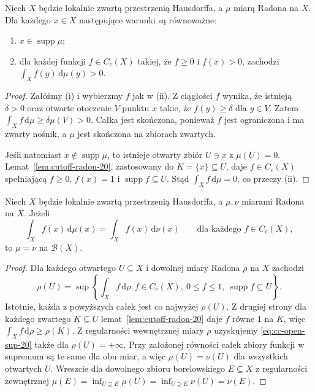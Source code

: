 \begin{wniosek}
\label{cor:support-test-20}
Niech $X$ będzie lokalnie zwartą przestrzenią Hausdorffa,
a $\mu$ miarą Radona na $X$. Dla każdego $x\in X$
następujące warunki są równoważne:
\begin{enumerate}[label=\textup{(\roman*)}]
\item $x\in\operatorname{supp}\mu$;
\item dla każdej funkcji $f\in C_c(X)$ takiej, że
$f\ge0$ i $f(x)>0$, zachodzi
$\int_X f(y)\,\mathrm d\mu(y)>0$.
\end{enumerate}
\end{wniosek}
\begin{proof}
Załóżmy (i) i wybierzmy $f$ jak w (ii).
Z ciągłości $f$ wynika, że istnieją $\delta>0$
oraz otwarte otoczenie $V$ punktu $x$ takie,
że $f(y)\ge\delta$ dla $y\in V$. Zatem
$\int_Xf\,\mathrm d\mu\ge\delta\mu(V)>0$.
Całka jest skończona, ponieważ $f$ jest
ograniczona i ma zwarty nośnik, a $\mu$
jest skończona na zbiorach zwartych.

Jeśli natomiast $x\notin\operatorname{supp}\mu$,
to istnieje otwarty zbiór $U\ni x$ z $\mu(U)=0$.
Lemat~\ref{lem:cutoff-radon-20}, zastosowany do
$K=\{x\}\subseteq U$, daje $f\in C_c(X)$
spełniającą $f\ge0$, $f(x)=1$ i
$\operatorname{supp}f\subseteq U$.
Stąd $\int_X f\,\mathrm d\mu=0$, co przeczy (ii).
\end{proof}

\begin{twierdzenie}
\label{thm:uniqueness-cc-20}\label{tw:radon-unikalnosc}
Niech $X$ będzie lokalnie zwartą przestrzenią Hausdorffa,
a $\mu,\nu$ miarami Radona na $X$. Jeżeli
\[
\int_X f(x)\,\mathrm d\mu(x)
=\int_Xf(x)\,\mathrm d\nu(x)
\qquad\text{dla każdego }f\in C_c(X),
\]
to $\mu=\nu$ na $\mathcal B(X)$.
\end{twierdzenie}
\begin{proof}
Dla każdego otwartego $U\subseteq X$ i dowolnej
miary Radona $\rho$ na $X$ zachodzi
\begin{equation}\label{eq:cc-open-sup-20}
\rho(U)=\sup\left\{\int_Xf\,\mathrm d\rho:
 f\in C_c(X),\ 0\le f\le1,\
 \operatorname{supp}f\subseteq U\right\}.
\end{equation}
Istotnie, każda z powyższych całek jest co najwyżej
$\rho(U)$. Z drugiej strony dla każdego zwartego
$K\subseteq U$ lemat~\ref{lem:cutoff-radon-20}
daje $f$ równe $1$ na $K$, więc
$\int_Xf\,\mathrm d\rho\ge\rho(K)$.
Z regularności wewnętrznej miary $\rho$
uzyskujemy \eqref{eq:cc-open-sup-20} także dla
$\rho(U)=+\infty$. Przy założonej równości całek
zbiory funkcji w supremum są te same dla obu miar,
a więc $\mu(U)=\nu(U)$ dla wszystkich otwartych $U$.
Wreszcie dla dowolnego zbioru borelowskiego
$E\subseteq X$ z regularności zewnętrznej
$\mu(E)=\inf_{U\supseteq E}\mu(U)
=\inf_{U\supseteq E}\nu(U)=\nu(E)$.
\end{proof}

